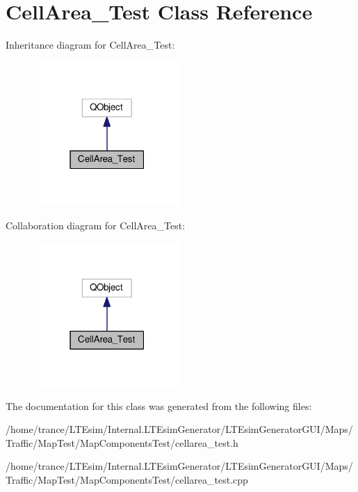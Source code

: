 \hypertarget{class_cell_area___test}{}\section{Cell\+Area\+\_\+\+Test Class Reference}
\label{class_cell_area___test}


Inheritance diagram for Cell\+Area\+\_\+\+Test\+:
\nopagebreak
\begin{figure}[H]
\begin{center}
\leavevmode
\includegraphics[width=159pt]{class_cell_area___test__inherit__graph}
\end{center}
\end{figure}


Collaboration diagram for Cell\+Area\+\_\+\+Test\+:
\nopagebreak
\begin{figure}[H]
\begin{center}
\leavevmode
\includegraphics[width=159pt]{class_cell_area___test__coll__graph}
\end{center}
\end{figure}


The documentation for this class was generated from the following files\+:\begin{DoxyCompactItemize}
\item 
/home/trance/\+L\+T\+Esim/\+Internal.\+L\+T\+Esim\+Generator/\+L\+T\+Esim\+Generator\+G\+U\+I/\+Maps/\+Traffic/\+Map\+Test/\+Map\+Components\+Test/cellarea\+\_\+test.\+h\item 
/home/trance/\+L\+T\+Esim/\+Internal.\+L\+T\+Esim\+Generator/\+L\+T\+Esim\+Generator\+G\+U\+I/\+Maps/\+Traffic/\+Map\+Test/\+Map\+Components\+Test/cellarea\+\_\+test.\+cpp\end{DoxyCompactItemize}
